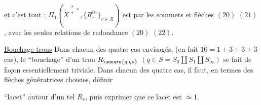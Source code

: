 et c'est tout : $\Pi_1(\widetilde{X}^{\substack{*\\*}*},\{R_r^{01}\}_{r\in\mathcal{R}})$ est   par les sommets et flèches $(20)$ $(21)$, avec les seules relations de redondance $(20)$ $(22)$.

\uline{Bouchage  trous} Dans chacun des quatre cas envisagés, (en fait $10=1+3+3+3$ cas), le ``bouchage'' d'un trou $R_{\unsure{q|qs}}$ $(q\in S=S_0\amalg S_1\amalg S_\infty)$ se fait de façon essentiellement triviale. Dans chacun des quatre cas, il faut, en termes des flèches génératrices choisies, définir 



``lacet'' autour d'un tel $R_s$, puis exprimer que ce lacet est $\simeq1$.

